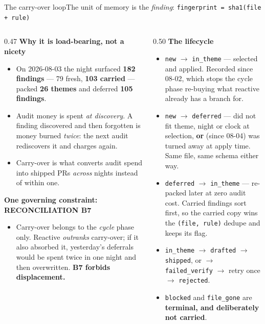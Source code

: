 \documentclass[aspectratio=169,11pt]{beamer}
\newcommand{\good}[1]{\textcolor{jsAccent}{\textbf{#1}}}
\begin{document}
\begin{frame}{The carry-over loop}{The unit of memory is the \emph{finding}: \texttt{fingerprint = sha1(file + rule)}}
  \scriptsize
  \begin{columns}[T]
    \begin{column}{0.47\textwidth}
      \textbf{Why it is load-bearing, not a nicety}
      \begin{itemize}
        \item On 2026-08-03 the night surfaced \textbf{182 findings} --- 79 fresh, \good{103 carried} --- packed \textbf{26 themes} and deferred \textbf{105 findings}.
        \item Audit money is spent \emph{at discovery}. A finding discovered and then forgotten is money burned \emph{twice}: the next audit rediscovers it and charges again.
        \item Carry-over is what converts audit spend into shipped PRs \emph{across} nights instead of within one.
      \end{itemize}
      \vspace{0.3em}
      \textbf{One governing constraint: RECONCILIATION B7}
      \begin{itemize}
        \item Carry-over belongs to the \emph{cycle} phase only. Reactive \emph{outranks} carry-over; if it also absorbed it, yesterday's deferrals would be spent twice in one night and then overwritten. \textbf{B7 forbids displacement.}
      \end{itemize}
    \end{column}
    \begin{column}{0.50\textwidth}
      \textbf{The lifecycle}
      \begin{itemize}
        \item \texttt{new} $\rightarrow$ \texttt{in\_theme} --- selected and applied. Recorded since 08-02, which stops the cycle phase re-buying what reactive already has a branch for.
        \item \texttt{new} $\rightarrow$ \texttt{deferred} --- did not fit theme, night or clock at selection, \textbf{or} (since 08-04) was turned away at apply time. Same file, same schema either way.
        \item \texttt{deferred} $\rightarrow$ \texttt{in\_theme} --- re-packed later at zero audit cost. Carried findings sort first, so the carried copy wins the \texttt{(file, rule)} dedupe and keeps its flag.
        \item \texttt{in\_theme} $\rightarrow$ \texttt{drafted} $\rightarrow$ \texttt{shipped}, or $\rightarrow$ \texttt{failed\_verify} $\rightarrow$ retry once $\rightarrow$ \texttt{rejected}.
        \item \texttt{blocked} and \texttt{file\_gone} are \textbf{terminal, and deliberately not carried}.
      \end{itemize}
    \end{column}
  \end{columns}
\end{frame}
\end{document}
